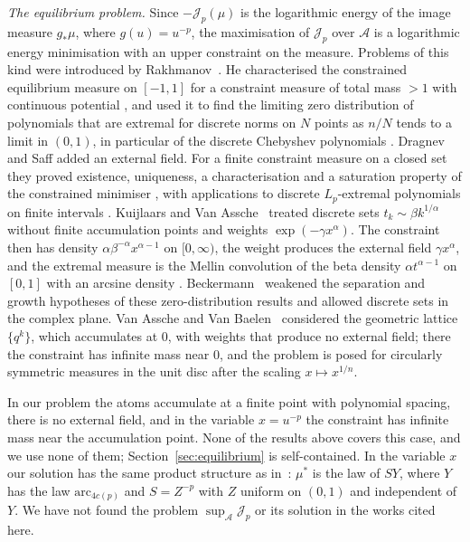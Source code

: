 \documentclass{amsart}
\theoremstyle{definition}
\theoremstyle{remark}
\numberwithin{equation}{section}
\newcommand{\cA}{\mathcal{A}}
\newcommand{\cJ}{\mathcal{J}}
\newcommand{\arc}{\mathrm{arc}}
\begin{document}
\emph{The equilibrium problem.} Since $-\cJ_p(\mu)$ is the logarithmic energy of the image measure $g_*\mu$, where
$g(u)=u^{-p}$, the maximisation of $\cJ_p$ over $\cA$ is a logarithmic energy minimisation with an upper constraint on
the measure. Problems of this kind were introduced by Rakhmanov~\cite{Rakhmanov}. He characterised the constrained
equilibrium measure on $[-1,1]$ for a constraint measure of total mass $>1$ with continuous potential
\cite[Thm.~3]{Rakhmanov}, and used it to find the limiting zero distribution of polynomials that are extremal for
discrete norms on $N$ points as $n/N$ tends to a limit in $(0,1)$, in particular of the discrete Chebyshev polynomials
\cite[Thms.~1 and~2]{Rakhmanov}. Dragnev and Saff added an external field. For a finite constraint measure on a closed set they proved existence,
uniqueness, a characterisation and a saturation property of the constrained minimiser \cite[Thms.~2.1
and~2.6]{DragnevSaff}, with applications to discrete $L_p$-extremal polynomials on finite intervals
\cite[Thm.~3.3]{DragnevSaff}. Kuijlaars and Van Assche~\cite{KVA-PLMS} treated discrete sets
$t_k\sim\beta k^{1/\alpha}$ without finite accumulation points and weights $\exp(-\gamma x^\alpha)$. The constraint then
has density $\alpha\beta^{-\alpha}x^{\alpha-1}$ on $[0,\infty)$, the weight produces the external field $\gamma
x^\alpha$, and the extremal measure is the Mellin convolution of the beta density $\alpha t^{\alpha-1}$ on $[0,1]$ with
an arcsine density \cite[Thms.~2.1 and~2.2]{KVA-PLMS}. Beckermann~\cite[Thm.~1.3]{Beckermann} weakened the separation
and growth hypotheses of these zero-distribution results and allowed discrete sets in the complex plane. Van Assche and Van
Baelen~\cite[Thm.~2.2]{VAVB} considered the geometric lattice $\{q^k\}$, which accumulates at $0$, with weights that
produce no external field; there the constraint has infinite mass near $0$, and the problem is posed for circularly
symmetric measures in the unit disc after the scaling $x\mapsto x^{1/n}$.

In our problem the atoms accumulate at a finite point with polynomial spacing, there is no external field, and in the
variable $x=u^{-p}$ the constraint has infinite mass near the accumulation point. None of the results above covers this
case, and we use none of them; Section~\ref{sec:equilibrium} is self-contained. In the variable $x$ our solution has
the same product structure as in~\cite{KVA-PLMS}: $\mu^*$ is the law of $SY$, where $Y$ has the law $\arc_{4c(p)}$ and $S=Z^{-p}$ with $Z$ uniform on $(0,1)$ and independent of $Y$. We have not
found the problem $\sup_\cA\cJ_p$ or its solution in the works cited here.
\end{document}
